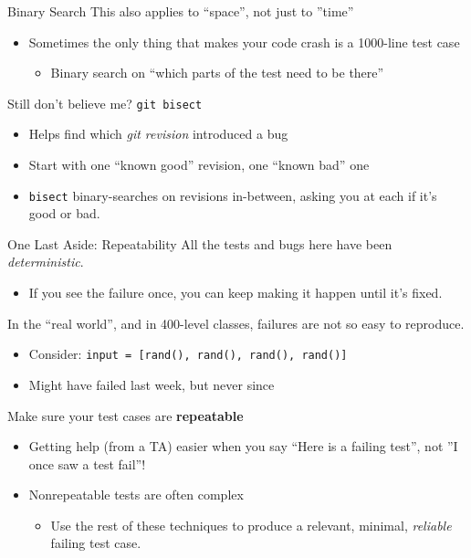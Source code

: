 \documentclass[xcolor=dvipsnames]{beamer}
\begin{document}
\begin{frame}{Binary Search}
	This also applies to ``space'', not just to ''time''
	\begin{itemize}
		\item Sometimes the only thing that makes your code crash is a 1000-line test case
		\begin{itemize}
			\item Binary search on ``which parts of the test need to be there''
		\end{itemize}
	\end{itemize}
	\pause
	\linegap
	Still don't believe me? \texttt{git bisect}
	\begin{itemize}
		\item Helps find which {\em git revision} introduced a bug
		\item Start with one ``known good'' revision, one ``known bad'' one
		\item \texttt{bisect} binary-searches on revisions in-between, asking you at each if it's good or bad.
	\end{itemize}
\end{frame}

\begin{frame}{One Last Aside: Repeatability}
	All the tests and bugs here have been {\em deterministic}.
	\begin{itemize}
		\item If you see the failure once, you can keep making it happen until it's fixed.
	\end{itemize}
	\pause
	\linegap

	In the ``real world'', and in 400-level classes, failures are not so easy to reproduce.
	\begin{itemize}
		\item Consider: \texttt{input = [rand(), rand(), rand(), rand()]}
		\item Might have failed last week, but never since
	\end{itemize}
	\pause
	\linegap
	Make sure your test cases are {\bf repeatable}
	\begin{itemize}
		\item Getting help (from a TA) easier when you say ``Here is a failing test'', not ''I once saw a test fail''!
		\item Nonrepeatable tests are often complex
		\begin{itemize}
			\item Use the rest of these techniques to produce a relevant, minimal, {\em reliable} failing test case.
		\end{itemize}
	\end{itemize}
\end{frame}
\end{document}
